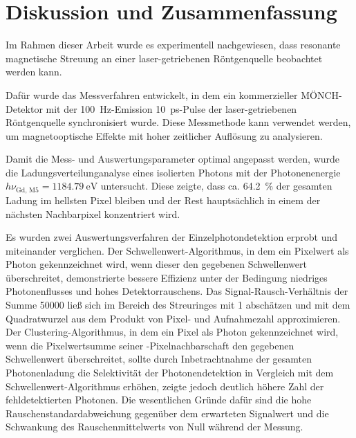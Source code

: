 \chapter{Diskussion und Zusammenfassung}
Im Rahmen dieser Arbeit wurde es experimentell nachgewiesen, dass resonante magnetische Streuung an einer laser-getriebenen Röntgenquelle beobachtet werden kann.
\begin{figure}[H]
    \centering
    
    \label{fig:summary_ring_no_ring}
\end{figure}
\noindent
Dafür wurde das Messverfahren entwickelt, in dem ein kommerzieller MÖNCH-Detektor mit der \SI{100}{\hertz}-Emission \SI{10}{\pico\second}-Pulse der laser-getriebenen Röntgenquelle synchronisiert wurde. Diese Messmethode kann verwendet werden, um magnetooptische Effekte mit hoher zeitlicher Auflösung zu analysieren. 

\noindent
Damit die Mess- und Auswertungsparameter optimal angepasst werden, wurde die Ladungsverteilunganalyse eines isolierten Photons mit der Photonenenergie $h\nu_\text{Gd, M5} = \SI{1184,79}{\eV}$ untersucht. Diese zeigte, dass ca. \SI{64,2}{\percent} der gesamten Ladung im hellsten Pixel bleiben und der Rest hauptsächlich in einem der nächsten Nachbarpixel konzentriert wird.

\noindent
Es wurden zwei Auswertungsverfahren der Einzelphotondetektion erprobt und miteinander verglichen. Der Schwellenwert-Algorithmus, in dem ein Pixelwert als Photon gekennzeichnet wird, wenn dieser den gegebenen Schwellenwert überschreitet, demonstrierte bessere Effizienz unter der Bedingung niedriges Photonenflusses und hohes Detektorrauschens. Das Signal-Rausch-Verhältnis der Summe \SI{50000}{\captures} ließ sich im Bereich des Streuringes mit 1 abschätzen und mit dem Quadratwurzel aus dem Produkt von Pixel- und Aufnahmezahl approximieren. Der Clustering-Algorithmus, in dem ein Pixel als Photon gekennzeichnet wird, wenn die Pixelwertsumme seiner -Pixelnachbarschaft den gegebenen Schwellenwert überschreitet, sollte durch Inbetrachtnahme der gesamten Photonenladung die Selektivität der Photonendetektion in Vergleich mit dem Schwellenwert-Algorithmus erhöhen, zeigte jedoch deutlich höhere Zahl der fehldetektierten Photonen. Die wesentlichen Gründe dafür sind die hohe Rauschenstandardabweichung gegenüber dem erwarteten Signalwert und die Schwankung des Rauschenmittelwerts von Null während der Messung.

